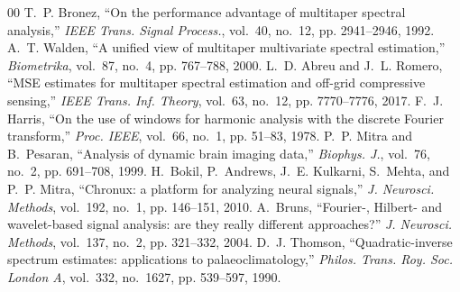 \documentclass[10pt,twocolumn]{article}
\begin{document}
\begin{thebibliography}{00}
 T.~P. Bronez, ``On the performance advantage of multitaper spectral analysis,'' \emph{IEEE Trans. Signal Process.}, vol.~40, no.~12, pp. 2941--2946, 1992.
 A.~T. Walden, ``A unified view of multitaper multivariate spectral estimation,'' \emph{Biometrika}, vol.~87, no.~4, pp. 767--788, 2000.
 L.~D. Abreu and J.~L. Romero, ``MSE estimates for multitaper spectral estimation and off-grid compressive sensing,'' \emph{IEEE Trans. Inf. Theory}, vol.~63, no.~12, pp. 7770--7776, 2017.
 F.~J. Harris, ``On the use of windows for harmonic analysis with the discrete Fourier transform,'' \emph{Proc. IEEE}, vol.~66, no.~1, pp. 51--83, 1978.
 P.~P. Mitra and B.~Pesaran, ``Analysis of dynamic brain imaging data,'' \emph{Biophys. J.}, vol.~76, no.~2, pp. 691--708, 1999.
 H.~Bokil, P.~Andrews, J.~E. Kulkarni, S.~Mehta, and P.~P. Mitra, ``Chronux: a platform for analyzing neural signals,'' \emph{J. Neurosci. Methods}, vol.~192, no.~1, pp. 146--151, 2010.
 A.~Bruns, ``Fourier-, Hilbert- and wavelet-based signal analysis: are they really different approaches?'' \emph{J. Neurosci. Methods}, vol.~137, no.~2, pp. 321--332, 2004.
 D.~J. Thomson, ``Quadratic-inverse spectrum estimates: applications to palaeoclimatology,'' \emph{Philos. Trans. Roy. Soc. London A}, vol.~332, no.~1627, pp. 539--597, 1990.
\end{thebibliography}
\end{document}

